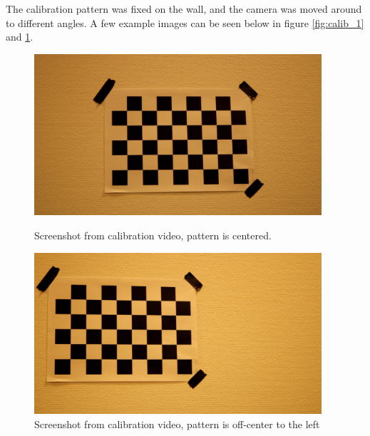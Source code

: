 The calibration pattern was fixed on the wall, and the camera was moved around to different angles. A few example images can be seen below in figure \ref{fig:calib_1} and \ref{fig:calib_2}.
\begin{figure}[h!]
    \centering
    \begin{minipage}[t]{0.48\textwidth}
        \centering
        \includegraphics[width=0.95\textwidth]{figures/CameraCalibration/im1.png}
        \caption{Screenshot from calibration video, pattern is centered.}
    \label{fig:calib_1}
    \end{minipage}%
    \hspace{.03\textwidth}
    \begin{minipage}[t]{0.48\textwidth}
        \centering
        \includegraphics[width=0.95\textwidth]{figures/CameraCalibration/im6.png}
        \caption{Screenshot from calibration video, pattern is off-center to the left}
        \label{fig:calib_2}
    \end{minipage}
\end{figure}

